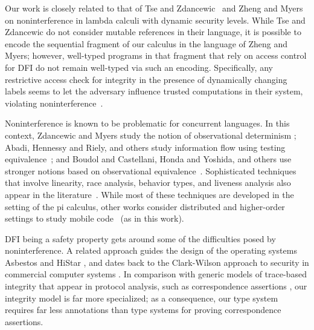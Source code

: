 \documentclass{sigplanconf}
\begin{document}
Our work is closely related to that of Tse and
Zdancewic~\cite{runtimeprin} and Zheng and Myers \cite{dynseclab} on
noninterference in lambda calculi with dynamic security levels. While Tse and Zdancewic do not consider mutable references in their language, it is possible to encode the sequential fragment of our calculus in the language of Zheng and Myers; however, well-typed programs in that fragment that rely on access control for DFI do not remain well-typed via such an encoding. Specifically, any restrictive access check for integrity in the presence of dynamically changing labels seems to let the adversary influence trusted computations in their system, violating noninterference~\cite{zheng}. 





Noninterference is known to be problematic for concurrent languages. In this context, Zdancewic and Myers study the notion of observational determinism \cite{obsdetconc}; Abadi, Hennessy and Riely, and others study information flow using testing equivalence~\cite{abadi99secrecy,inflowresacc}; and Boudol and Castellani, Honda and Yoshida, and others use stronger notions based on observational equivalence~\cite{boudolcastellani,linearpi}. So\-phisticated techniques that involve linearity, race analysis, behavior types, and liveness analysis also appear in the literature~\cite{linearpi,obsdetconc,inflowresacc,kobayashi05}. While most of these techniques are developed in the setting of the pi calculus, other works consider distributed and higher-order settings to study mobile code~\cite{safedpi,depHOMP,envbisim} (as in this work).

DFI being a safety property \cite{alpernschneider} gets around some of the difficulties posed by noninterference. A related approach guides the design of the operating systems  Asbestos \cite{asbestos} and HiStar \cite{histar}, and dates back to the Clark-Wilson approach to security in commercial computer systems \cite{clark-wilson,shankar}. In comparison with generic models of trace-based integrity that appear in protocol analysis, such as correspondence assertions \cite{typecorr,fournetGM05}, our integrity model is far more specialized; as a consequence, our type system requires far less annotations than type systems for proving correspondence assertions. 
\end{document}

